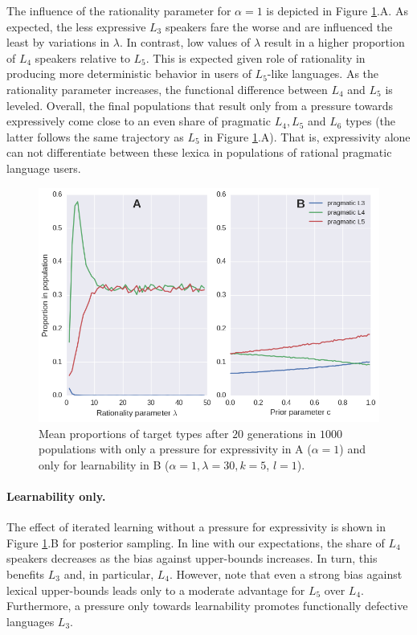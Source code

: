 \documentclass[a4paper]{article}
\begin{document}
The influence of the rationality parameter for $\alpha = 1$ is depicted in Figure \ref{fig:either-R-or-M}.A. As expected, the less expressive $L_3$ speakers fare the worse and are influenced the least by variations in $\lambda$. In contrast, low values of $\lambda$ result in a higher proportion of $L_4$ speakers relative to $L_5$. This is expected given role of rationality in producing more deterministic behavior in users of $L_5$-like languages. As the rationality parameter increases, the functional difference between $L_4$ and $L_5$ is leveled. Overall, the final populations that result only from a pressure towards expressively come close to an even share of pragmatic $L_4, L_5$ and $L_6$ types (the latter follows the same trajectory as $L_5$ in Figure \ref{fig:either-R-or-M}.A).  That is, expressivity alone can not differentiate between these lexica in populations of rational pragmatic language users.  

\begin{figure}
\centering
\includegraphics[scale=.5]{./only-R-or-M}
\caption{Mean proportions of target types after $20$ generations in $1000$ populations with only a pressure for expressivity in A ($\alpha = 1$) and only for learnability in B ($\alpha =1, \lambda = 30, k = 5$, $l=1$).}
\label{fig:either-R-or-M}
\end{figure}

\paragraph{Learnability only.} The effect of iterated learning without a pressure for expressivity is shown in Figure \ref{fig:either-R-or-M}.B for posterior sampling. In line with our expectations, the share of $L_4$ speakers decreases as the bias against upper-bounds increases. In turn, this benefits $L_3$ and, in particular, $L_4$. However, note that even a strong bias against lexical upper-bounds leads only to a moderate advantage for $L_5$ over $L_4$. Furthermore, a pressure only towards learnability promotes functionally defective languages $L_3$.
\end{document}
